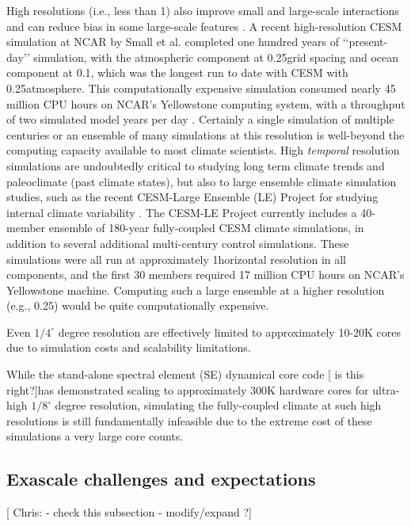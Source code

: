  High resolutions (i.e., less than 1\degree)  also improve small and large-scale interactions and can reduce bias in some large-scale features \cite{small2014}.  A recent high-resolution CESM simulation at NCAR by Small et al. \cite{small2014} completed one hundred years of ‘‘present-day’’ simulation, with the atmospheric component at 0.25\degree grid spacing and ocean component at 0.1\degree, which was the longest run to date with CESM with 0.25\degree atmosphere.  This computationally expensive simulation consumed nearly 45 million CPU hours on NCAR's Yellowstone computing system, with a throughput of two simulated model years per day \cite{small2014}. Certainly a single simulation of multiple centuries or an ensemble of many simulations at this resolution is well-beyond the computing capacity available to most climate scientists.  High \textit{temporal} resolution simulations are undoubtedly critical to studying long term climate trends and paleoclimate (past climate states), but also to large ensemble climate simulation studies, such as the recent CESM-Large Ensemble (LE) Project for studying internal climate variability \citep{kay2015}.  The CESM-LE Project currently includes a 40-member ensemble of 180-year fully-coupled CESM climate simulations, in addition to several additional multi-century control simulations.  These simulations were all run at approximately 1\degree horizontal resolution in all components, and the first 30 members required 17 million CPU hours on NCAR's Yellowstone machine.  Computing such a large ensemble at a higher resolution (e.g., 0.25\degree) would be quite computationally expensive.


 Even $1/4^\circ$ degree resolution are effectively limited to approximately 10-20K cores due to simulation costs and scalability limitations.  


While the stand-alone spectral element (SE) dynamical core code [{\color{red} is this right?}]has demonstrated scaling to approximately 300K hardware cores \cite{came} for ultra-high $1/8^\circ$ degree resolution, simulating the fully-coupled climate at such high resolutions is still fundamentally infeasible due to the extreme cost of these simulations a very large core counts. 


\subsection{Exascale challenges and expectations}
[{\color{red} Chris:} - check this subsection - modify/expand ?]

